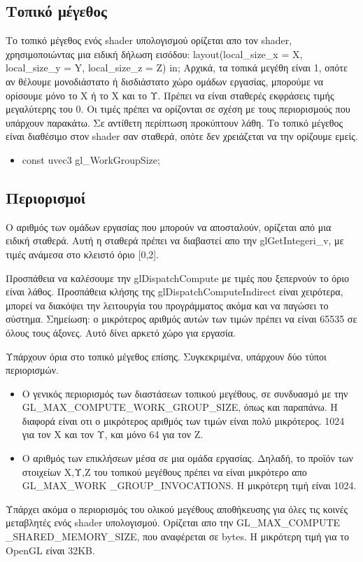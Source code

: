 \subsection{Τοπικό μέγεθος}
Το τοπικό μέγεθος ενός shader υπολογισμού ορίζεται απο τον shader, χρησιμοποιώντας μια ειδική δήλωση εισόδου: 
layout(local\_size\_x = X, local\_size\_y = Y, local\_size\_z = Z) in;
Αρχικά, τα τοπικά μεγέθη είναι 1, οπότε αν θέλουμε μονοδιάστατο ή δισδιάστατο χώρο ομάδων εργασίας, μπορούμε να ορίσουμε μόνο το Χ ή το Χ και το Υ. Πρέπει να είναι σταθερές εκφράσεις τιμής μεγαλύτερης του 0. Οι τιμές πρέπει να ορίζονται σε σχέση με τους περιορισμούς που υπάρχουν παρακάτω. Σε αντίθετη περίπτωση προκύπτουν λάθη. Το τοπικό μέγεθος είναι διαθέσιμο στον shader σαν σταθερά, οπότε δεν χρειάζεται να την ορίζουμε εμείς.
\begin{itemize}
\item const uvec3 gl\_WorkGroupSize;
\end{itemize}
\subsection{Περιορισμοί}
Ο αριθμός των ομάδων εργασίας που μπορούν να αποσταλούν, ορίζεται από μια ειδική σταθερά. Αυτή η σταθερά πρέπει να διαβαστεί απο την glGetIntegeri\_v, με τιμές ανάμεσα στο κλειστό όριο [0,2]. 

Προσπάθεια να καλέσουμε την glDispatchCompute με τιμές που ξεπερνούν το όριο είναι λάθος. Προσπάθεια κλήσης της glDispatchComputeIndirect είναι χειρότερα, μπορεί να διακόψει την λειτουργία του προγράμματος ακόμα και να παγώσει το σύστημα. Σημείωση: ο μικρότερος αριθμός αυτών των τιμών πρέπει να είναι 65535 σε όλους τους άξονες. Αυτό δίνει αρκετό χώρο για εργασία. 

Υπάρχουν όρια στο τοπικό μέγεθος επίσης. Συγκεκριμένα, υπάρχουν δύο τύποι περιορισμών. 
\begin{itemize}
\item Ο γενικός περιορισμός των διαστάσεων τοπικού μεγέθους, σε συνδυασμό με την GL\_MAX\_COMPUTE\_WORK\_GROUP\_SIZE, όπως και παραπάνω. Η διαφορά είναι οτι ο μικρότερος αριθμός των τιμών είναι πολύ μικρότερος. 1024 για τον Χ και τον Υ, και μόνο 64 για τον Ζ.
\item Ο αριθμός των επικλήσεων μέσα σε μια ομάδα εργασίας. Δηλαδή, το προϊόν των στοιχείων Χ,Υ,Ζ του τοπικού μεγέθους πρέπει να είναι μικρότερο απο GL\_MAX\_WORK \_GROUP\_INVOCATIONS. Η μικρότερη τιμή είναι 1024.
\end{itemize}
Υπάρχει ακόμα ο περιορισμός του ολικού μεγέθους αποθήκευσης για όλες τις κοινές μεταβλητές ενός shader υπολογισμού. Ορίζεται απο την GL\_MAX\_COMPUTE \_SHARED\_MEMORY\_SIZE, που αναφέρεται σε bytes. Η μικρότερη τιμή για το OpenGL είναι 32KB.
